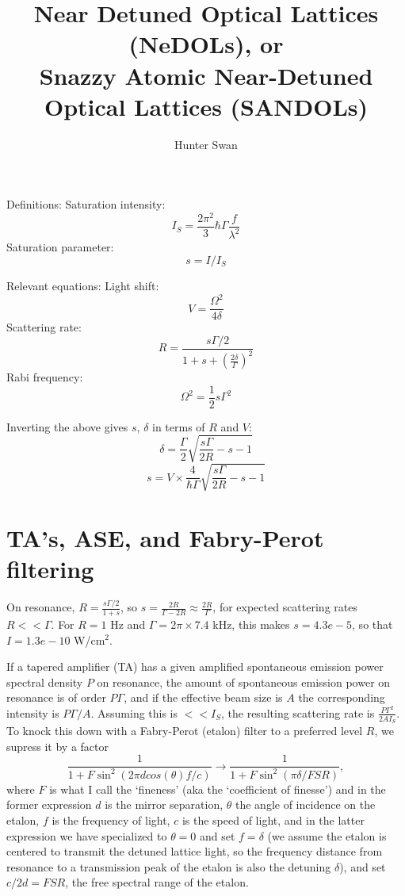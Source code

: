 \documentclass[aps,twocolumn,prb,floatfix,amsmath,amssymb,groupedaddress]{revtex4}
\begin{document}
\providecommand{\half}{{\frac{1}{2}}}		%

\title{Near Detuned Optical Lattices (NeDOLs), or \\ Snazzy Atomic Near-Detuned Optical Lattices (SANDOLs)}

\author{Hunter Swan}

\maketitle

Definitions:
Saturation intensity: \[I_S = \frac{2\pi^2}{3} \hbar\Gamma \frac{f}{\lambda^2}\]
Saturation parameter: \[s = I/I_S\]

Relevant equations:
Light shift: \[V = \frac{\Omega^2}{4\delta}\]
Scattering rate: \[R = \frac{s\Gamma/2}{1+s+\left(\frac{2\delta}{\Gamma}\right)^2}\]
Rabi frequency: \[\Omega^2 = \half s \Gamma^2\]

Inverting the above gives $s$, $\delta$ in terms of $R$ and $V$:
\[\delta = \frac{\Gamma}{2}\sqrt{\frac{s\Gamma}{2R}-s-1}\]
\[s = V \times \frac{4}{\hbar\Gamma} \sqrt{\frac{s\Gamma}{2R}-s-1}\]


\section{TA's, ASE, and Fabry-Perot filtering}
On resonance, $R = \frac{s\Gamma/2}{1+s}$, so $s=\frac{2R}{\Gamma-2R}\approx \frac{2R}{\Gamma}$, for expected scattering rates $R<<\Gamma$.  For $R=1$ Hz and $\Gamma=2\pi\times 7.4$ kHz, this makes $s=4.3e-5$, so that $I=1.3 e-10$ W/cm$^2$.

If a tapered amplifier (TA) has a given amplified spontaneous emission power spectral density $P$ on resonance, the amount of spontaneous emission power on resonance is of order $P\Gamma$, and if the effective beam size is $A$ the corresponding intensity is $P\Gamma/A$.  Assuming this is $<<I_S$, the resulting scattering rate is $\frac{P\Gamma^2}{2AI_S}$.  To knock this down with a Fabry-Perot (etalon) filter to a preferred level $R$, we supress it by a factor \[\frac{1}{1+F\sin^2\left( 2\pi d cos(\theta) f/c \right)} \rightarrow \frac{1}{1+F\sin^2\left( \pi \delta/FSR \right)},\]
where $F$ is what I call the `fineness' (aka the `coefficient of finesse') and in the former expression $d$ is the mirror separation, $\theta$ the angle of incidence on the etalon, $f$ is the frequency of light, $c$ is the speed of light, and in the latter expression we have specialized to $\theta=0$ and set $f=\delta$ (we assume the etalon is centered to transmit the detuned lattice light, so the frequency distance from resonance to a transmission peak of the etalon is also the detuning $\delta$), and set $c/2d = FSR$, the free spectral range of the etalon. 
\end{document}
